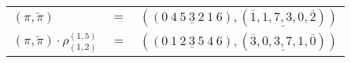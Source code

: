 \begin{example}\label{example:KXXIMDRH}
  \hfill \break
  \begin{tabular}{lll}
    $(\pi,\breve\pi)$ & $=$ & $(({0}~\underline{{4}~{5}~{3}~{2}~{1}}~{6}),(\overline{1},\underline{1,7,3,0},\overline{2}))$ \\
    $(\pi,\breve\pi) \cdot \rho^{(1,5)}_{(1,2)}$ & $=$ & $(({0}~\underline{{1}~{2}~{3}~{5}~{4}}~{6}),(\overline{3},\underline{0,3,7,1},\overline{0}))$ \\
  \end{tabular}
\end{example}